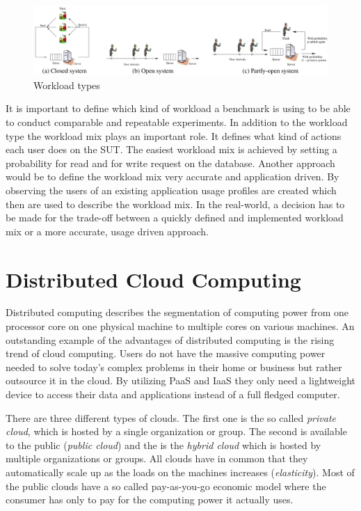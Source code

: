 \begin{figure}[h]
  \centering
  \includegraphics[width=\textwidth]{Figures/workload_types.png}
  \caption[Workload types]{Workload types}
  \label{fig:workload-types}
\end{figure}

It is important to define which kind of workload a benchmark is using to be able to conduct comparable and repeatable experiments. In addition to the workload type the workload mix plays an important role. It defines what kind of actions each user does on the \ac{SUT}. The easiest workload mix is achieved by setting a probability for read and for write request on the database. Another approach would be to define the workload mix very accurate and application driven. By observing the users of an existing application usage profiles are created which then are used to describe the workload mix. In the real-world, a decision has to be made for the trade-off between a quickly defined and implemented workload mix or a more accurate, usage driven approach.

\section{Distributed Cloud Computing}
\label{sec:distributed-computing}
Distributed computing describes the segmentation of computing power from one processor core on one physical machine to multiple cores on various machines. An outstanding example of the advantages of distributed computing is the rising trend of cloud computing. Users do not have the massive computing power needed to solve today's complex problems in their home or business but rather outsource it in the cloud. By utilizing \acf{PaaS} and \acf{IaaS} they only need a lightweight device to access their data and applications instead of a full fledged computer. \cite[1 - 2]{dikaiakos.2009}

There are three different types of clouds. The first one is the so called \emph{private cloud}, which is hosted by a single organization or group. The second is available to the public (\emph{public cloud}) and the is the \emph{hybrid cloud} which is hosted by multiple organizations or groups. All clouds have in common that they automatically scale up as the loads on the machines increases (\emph{elasticity}). Most of the public clouds have a so called pay-as-you-go economic model where the consumer has only to pay for the computing power it actually uses. \cite[2]{dikaiakos.2009}


